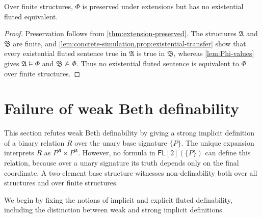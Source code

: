 \documentclass{lmcs}
\newcommand{\FL}{\mathsf{FL}}
\newcommand{\A}{\mathfrak{A}}
\newcommand{\B}{\mathfrak{B}}
\begin{document}
\begin{cor}
\label{cor:finite-los-tarski}
Over finite structures, \(\Phi\) is preserved under extensions but has no
existential fluted equivalent.
\end{cor}

\begin{proof}
Preservation follows from \cref{thm:extension-preserved}.  The structures
\(\A\) and \(\B\) are finite, and
\cref{lem:concrete-simulation,prop:existential-transfer} show that every
existential fluted sentence true in \(\A\) is true in \(\B\), whereas
\cref{lem:Phi-values} gives \(\A\models\Phi\) and \(\B\not\models\Phi\).
Thus no existential fluted sentence is equivalent to \(\Phi\) over finite
structures.
\end{proof}

\section{Failure of weak Beth definability}\label{sec:wbdp}
This section refutes weak Beth definability by giving a strong implicit
definition of a binary relation $R$ over the unary base signature $\{P\}$.
The unique expansion interprets $R$ as $P^{\A}\times P^{\A}$.  However, no
formula in $\FL[2](\{P\})$ can define this relation, because over a unary
signature its truth depends only on the final coordinate.  A two-element
base structure witnesses non-definability both over all structures and over
finite structures.

We begin by fixing the notions of implicit and explicit fluted definability,
including the distinction between weak and strong implicit definitions.
\end{document}

